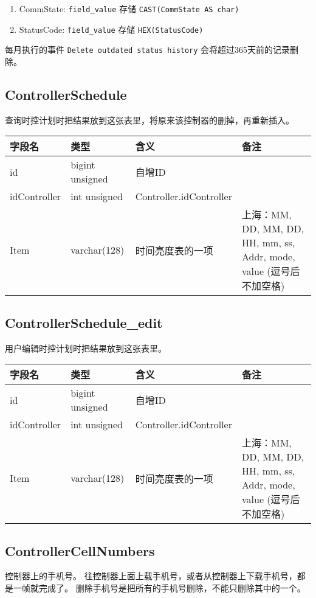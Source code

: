 \begin{enumerate}
\def\labelenumi{\arabic{enumi}.}
\itemsep1pt\parskip0pt
\item
  CommState: \texttt{field\_value} 存储 \texttt{CAST(CommState AS char)}
\item
  StatusCode: \texttt{field\_value} 存储 \texttt{HEX(StatusCode)}
\end{enumerate}

每月执行的事件 \texttt{Delete outdated status history}
会将超过365天前的记录删除。

\subsection{ControllerSchedule}\label{controllerschedule}

查询时控计划时把结果放到这张表里，将原来该控制器的删掉，再重新插入。

\begin{longtabu}[c]{@{}lXXX@{}}
\toprule
字段名 & 类型 & 含义 & 备注\tabularnewline
\midrule
\endhead
id & bigint unsigned & 自增ID &\tabularnewline
idController & int unsigned & Controller.idController &\tabularnewline
Item & varchar(128) & 时间亮度表的一项 & 上海：MM, DD, MM, DD, HH, mm,
ss, Addr, mode, value (逗号后不加空格)\tabularnewline
\bottomrule
\end{longtabu}

\subsection{ControllerSchedule\_edit}\label{controllerscheduleux5fedit}

用户编辑时控计划时把结果放到这张表里。

\begin{longtabu}[c]{@{}lXXX@{}}
\toprule
字段名 & 类型 & 含义 & 备注\tabularnewline
\midrule
\endhead
id & bigint unsigned & 自增ID &\tabularnewline
idController & int unsigned & Controller.idController &\tabularnewline
Item & varchar(128) & 时间亮度表的一项 & 上海：MM, DD, MM, DD, HH, mm,
ss, Addr, mode, value (逗号后不加空格)\tabularnewline
\bottomrule
\end{longtabu}

\subsection{ControllerCellNumbers}\label{controllercellnumbers}

控制器上的手机号。
往控制器上面上载手机号，或者从控制器上下载手机号，都是一帧就完成了。
删除手机号是把所有的手机号删除，不能只删除其中的一个。

